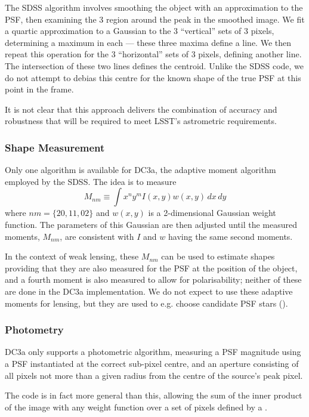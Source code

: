 The SDSS algorithm involves smoothing the object with an approximation to the PSF, then examining
the 3 region around the peak in the smoothed image.  We fit a quartic approximation to
a Gaussian to the 3 ``vertical'' sets of 3 pixels, determining a maximum in each --- these three
maxima define a line.  We then repeat this operation for the 3 ``horizontal'' sets of 3 pixels,
defining another line.  The intersection of these two lines defines the centroid.  Unlike the
SDSS code, we do not attempt to debias this centre for the known shape of the true PSF at this
point in the frame.

It is not clear that this approach delivers the combination of accuracy and robustness that will be required to meet
LSST's astrometric requirements.

\subsubsection{Shape Measurement}

Only one algorithm is available for DC3a, the adaptive moment algorithm
employed by the SDSS.  The idea is to measure
$$
M_{nm} \equiv \int x^n y^m I(x, y) w(x, y) \,dx\,dy
$$
where $nm = \{20, 11, 02\}$ and $w(x, y)$ is a 2-dimensional Gaussian weight function.  The
parameters of this Gaussian are then adjusted until the measured
moments, $M_{nm}$, are consistent with $I$ and $w$ having the same second moments.

In the context of weak lensing, these $M_{nm}$ can be used to estimate shapes providing
that they are also measured for the PSF at the position of the object, and a fourth
moment is also measured to allow for polarisability;  neither of these are done in the
DC3a implementation.   We do not expect to use these adaptive moments for lensing, but
they are used to e.g. choose candidate PSF stars ().

\subsubsection{Photometry}

DC3a only supports a  photometric algorithm, measuring a PSF
magnitude using a PSF instantiated at the correct sub-pixel centre,  and
an aperture consisting of all pixels not more than a given radius from the
centre of the source's peak pixel.

The code is in fact more general than this, allowing the sum of the inner product
of the image with any weight function over a set of pixels defined by a .
